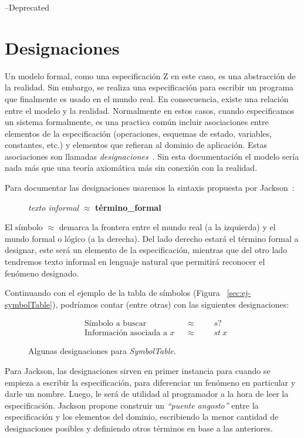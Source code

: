 --Deprecated
\chapter{Designaciones}
\label{cap:designaciones}

Un modelo formal, como una especificación Z en este caso, es una abstracción de la realidad. Sin embargo, se realiza una especificación para escribir un programa que finalmente es usado en el mundo real. En consecuencia, existe una relación entre el modelo y la realidad.
Normalmente en estos casos, cuando especificamos un sistema formalmente, es una practica común incluir asociaciones entre elementos de la especificación (operaciones, esquemas de estado, variables, constantes, etc.) y elementos que refieran al dominio de aplicación. Estas asociaciones son llamadas \emph{designaciones}~\cite{jackson}.
Sin esta documentación el modelo sería nada más que una teoría axiomática más sin conexión con la realidad. 

Para documentar las designaciones usaremos la sintaxis propuesta por Jackson~\cite{jackson}:

\begin{figure}[H]
  \centering
  \emph{texto informal} $\approx$ \textbf{término\_formal}
\end{figure}

El símbolo $\approx$ demarca la frontera entre el mundo real (a la izquierda) y el mundo formal o lógico (a la derecha). Del lado derecho estará el término formal a designar, este será un elemento de la especificación, mientras que del otro lado tendremos texto informal en lenguaje natural que permitirá reconocer el fenómeno designado.

Continuando con el ejemplo de la tabla de símbolos (Figura ~\ref{sec:ej-symbolTable}), podríamos contar (entre otras) con las siguientes designaciones:

\begin{figure}[H]
  \begin{align*} 
    &\text{Símbolo a buscar} && \approx &&&s? \\
    &\text{Información asociada a $x$} && \approx &&&st~x
  \end{align*}
  \caption{Algunas designaciones para \emph{SymbolTable}.}
  \label{fig:ej_designacion}
\end{figure}


Para Jackson, las designaciones sirven en primer instancia para cuando se empieza a escribir la especificación, para diferenciar un fenómeno en particular y darle un nombre. Luego, le será de utilidad al programador a la hora de leer la especificación. Jackson propone construir un \emph{``puente angosto''} entre la especificación y los elementos del dominio, escribiendo la menor cantidad de designaciones posibles y definiendo otros términos en base a las anteriores.


